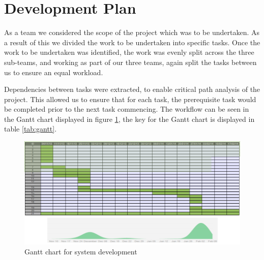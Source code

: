 \section{Development Plan}

As a team we considered the scope of the project which was to be undertaken.
 As a result of this we divided the work to be undertaken into specific tasks.
 Once the work to be undertaken was identified, the work was evenly split across 
the three sub-teams, and working as part of our three teams, again split the 
 tasks between us to ensure an equal workload.
 
Dependencies between tasks were extracted, to enable critical path analysis of the project. 
This allowed us to ensure that for each task, the prerequisite task would be completed 
prior to the next task commencing. The workflow can be seen in the Gantt chart displayed in 
figure \ref{fig:gantt}, the key for the Gantt chart is displayed in table \ref{tab:gantt}.

\begin{figure}[htbp!]
  \centering
  \includegraphics[scale=0.48]{images/GanttChart.png}
  \caption{Gantt chart for system development}
  \label{fig:gantt}
\end{figure}

